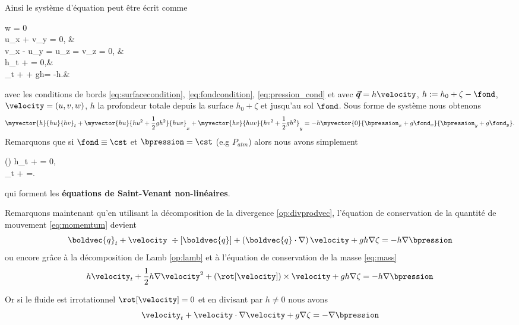 \begin{refe}
	Ainsi le système d'équation peut être écrit comme
	\begin{subnumcases}{}
	w = 0\\
	\textcolor{MyRed}{u_x + v_y = 0,} &\textcolor{MyRed}{}\label{eq:inc_contr}\\
	\textcolor{MyRed}{v_x - u_y = u_z = v_z = 0,} &\textcolor{MyRed}{}\label{eq:irr_contr}\\
	h_t + \div[\boldvec{q}] = 0,&\label{eq:mass} \\
	_t +  + gh\nabla\zeta= -h\nabla\bpression.&\label{eq:momemtum}
	\end{subnumcases}
	avec les conditions de bords \eqref{eq:surfacecondition}, \eqref{eq:fondcondition}, \eqref{eq:pression_cond} et	avec $\boldsymbol{\vec{q}}= h\velocity$,  $h:= h_0 + \zeta - \fond$, $\velocity = \left(u, v, w\right)$, $h$ la profondeur totale depuis la surface $h_0 + \zeta$ et jusqu'au sol $\fond$. Sous forme de système nous obtenons
	\begin{equation}
	\myvector{h}{hu}{hv}_t + \myvector{hu}{hu^2 + \frac{1}{2}gh^2}{hu v}_x + \myvector{hv}{hu v}{hv^2 + \frac{1}{2}gh^2}_y =-h \myvector{0}{\bpression_x +g \fond_x}{\bpression_y+g\fond_y} \label{eq:SWESYS}.
	\end{equation}
	Remarquons que si $\fond\equiv \cst$ et $\bpression = \cst$ (e.g $P_{atm}$) alors nous avons simplement
	\begin{subnumcases}{()}
	h_t + \div{} = 0,\\
	_t +  =.
	\end{subnumcases}
	qui forment les \textbf{équations de Saint-Venant non-linéaires}.
\end{refe}

\noindent Remarquons maintenant qu'en utilisant la décomposition de la divergence \eqref{op:divprodvec}, l'équation de conservation de la quantité de mouvement \eqref{eq:momemtum} devient
\begin{equation}
	\boldvec{q}_t +\velocity~\div[\boldvec{q}] + \left(\boldvec{q}\cdot\nabla\right)\velocity + gh\nabla\zeta  = -h\nabla\bpression
\end{equation}
ou encore grâce à la décomposition de Lamb \eqref{op:lamb} et à l'équation de conservation de la masse \eqref{eq:mass} 
\begin{equation}
h\velocity_t + \frac{1}{2}h\nabla\velocity^2 + \left(\rot[\velocity]\right)\times\velocity + gh\nabla \zeta = -h\nabla\bpression
\end{equation}
\vspace*{-5mm}
\begin{refe}
	Or si le fluide est irrotationnel $\rot[\velocity] = 0$ et en divisant par $h\neq 0$ nous avons
	\begin{equation}
	\velocity_t + \velocity\cdot\nabla\velocity + g\nabla \zeta  = - \nabla\bpression \label{eq:irrotationnel}
	\end{equation}
\end{refe}

